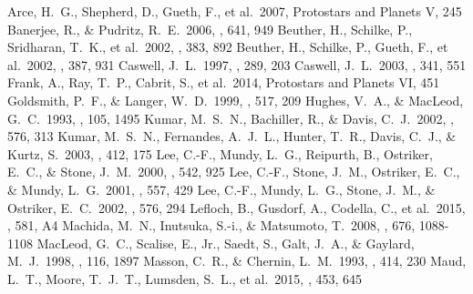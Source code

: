 \documentclass[twocolumn]{aastex62}
\begin{document}
\begin{thebibliography}{}
 Arce, H.~G., Shepherd, D., Gueth, F., et al.\ 2007, Protostars and Planets V, 245 
 Banerjee, R., \& Pudritz, R.~E.\ 2006, \apj, 641, 949 
 Beuther, H., Schilke, P., Sridharan, T.~K., et al.\ 2002, \aap, 383, 892
 Beuther, H., Schilke, P., Gueth, F., et al.\ 2002, \aap, 387, 931 
 Caswell, J.~L.\ 1997, \mnras, 289, 203 
 Caswell, J.~L.\ 2003, \mnras, 341, 551 
 Frank, A., Ray, T.~P., Cabrit, S., et al.\ 2014, Protostars and Planets VI, 451
 Goldsmith, P.~F., \& Langer, W.~D.\ 1999, \apj, 517, 209
 Hughes, V.~A., \& MacLeod, G.~C.\ 1993, \aj, 105, 1495
 Kumar, M.~S.~N., Bachiller, R., \& Davis, C.~J.\ 2002, \apj, 576, 313 
 Kumar, M.~S.~N., Fernandes, A.~J.~L., Hunter, T.~R., Davis, C.~J., \& Kurtz, S.\ 2003, \aap, 412, 175 
 Lee, C.-F., Mundy, L.~G., Reipurth, B., Ostriker, E.~C., \& Stone, J.~M.\ 2000, \apj, 542, 925
 Lee, C.-F., Stone, J.~M., Ostriker, E.~C., \& Mundy, L.~G.\ 2001, \apj, 557, 429 
 Lee, C.-F., Mundy, L.~G., Stone, J.~M., \& Ostriker, E.~C.\ 2002, \apj, 576, 294 
 Lefloch, B., Gusdorf, A., Codella, C., et al.\ 2015, \aap, 581, A4
 Machida, M.~N., Inutsuka, S.-i., \& Matsumoto, T.\ 2008, \apj, 676, 1088-1108  
 MacLeod, G.~C., Scalise, E., Jr., Saedt, S., Galt, J.~A., \& Gaylard, M.~J.\ 1998, \aj, 116, 1897 
 Masson, C.~R., \& Chernin, L.~M.\ 1993, \apj, 414, 230 
 Maud, L.~T., Moore, T.~J.~T., Lumsden, S.~L., et al.\ 2015, \mnras, 453, 645

\end{thebibliography}
\end{document}
